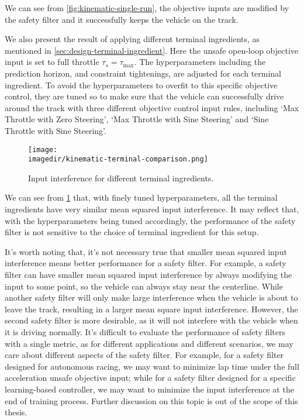 We can see from \cref{fig:kinematic-single-run}, the objective inputs are modified by the safety filter and it successfully keeps the vehicle on the track.

We also present the result of applying different terminal ingredients, as mentioned in \cref{sec:design-terminal-ingredient}.
Here the unsafe open-loop objective input is set to full throttle $\tau_s = \tau_{\max}$.
The hyperparameters including the prediction horizon, and constraint tightenings, are adjusted for each terminal ingredient.
To avoid the hyperparameters to overfit to this specific objective control, they are tuned so to make sure that the vehicle can successfully drive around the track with three different objective control input rules, including `Max Throttle with Zero Steering', `Max Throttle with Sine Steering' and `Sine Throttle with Sine Steering'.

\begin{figure}[ht]
    \centering
    \texttt{[image: \\imagedir/kinematic-terminal-comparison.png]}
    \caption{Input interference for different terminal ingredients.}
    \label{fig:kinematic-terminal-comparison}
\end{figure}

We can see from \cref{fig:kinematic-terminal-comparison} that, with finely tuned hyperparameters, all the terminal ingredients have very similar mean squared input interference.
It may reflect that, with the hyperparameters being tuned accordingly, the performance of the safety filter is not sensitive to the choice of terminal ingredient for this setup.

It's worth noting that, it's not necessary true that smaller mean squared input interference means better performance for a safety filter.
For example, a safety filter can have smaller mean squared input interference by always modifying the input to some point, so the vehicle can always stay near the centerline.
While another safety filter will only make large interference when the vehicle is about to leave the track, resulting in a larger mean square input interference.
However, the second safety filter is more desirable, as it will not interfere with the vehicle when it is driving normally.
It's difficult to evaluate the performance of safety filters with a single metric, as for different applications and different scenarios, we may care about different aspects of the safety filter.
For example, for a safety filter designed for autonomous racing, we may want to minimize lap time under the full acceleration unsafe objective input; while for a safety filter designed for a specific learning-based controller, we may want to minimize the input interference at the end of training process.
Further discussion on this topic is out of the scope of this thesis.


